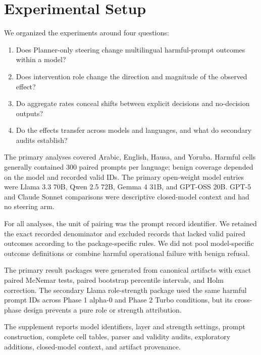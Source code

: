 \section{Experimental Setup}
We organized the experiments around four questions:
\begin{enumerate}
    \item Does Planner-only steering change multilingual harmful-prompt outcomes within a model?
    \item Does intervention role change the direction and magnitude of the observed effect?
    \item Do aggregate rates conceal shifts between explicit decisions and no-decision outputs?
    \item Do the effects transfer across models and languages, and what do secondary audits establish?
\end{enumerate}

The primary analyses covered Arabic, English, Hausa, and Yoruba. Harmful cells generally contained 300 paired prompts per language; benign coverage depended on the model and recorded valid IDs. The primary open-weight model entries were Llama 3.3 70B, Qwen 2.5 72B, Gemma 4 31B, and GPT-OSS 20B. GPT-5 and Claude Sonnet comparisons were descriptive closed-model context and had no steering arm.

For all analyses, the unit of pairing was the prompt record identifier. We retained the exact recorded denominator and excluded records that lacked valid paired outcomes according to the package-specific rules. We did not pool model-specific outcome definitions or combine harmful operational failure with benign refusal.

The primary result packages were generated from canonical artifacts with exact paired McNemar tests, paired bootstrap percentile intervals, and Holm correction. The secondary Llama role-strength package used the same harmful prompt IDs across Phase 1 alpha-0 and Phase 2 Turbo conditions, but its cross-phase design prevents a pure role or strength attribution.

The supplement reports model identifiers, layer and strength settings, prompt construction, complete cell tables, parser and validity audits, exploratory additions, closed-model context, and artifact provenance.
